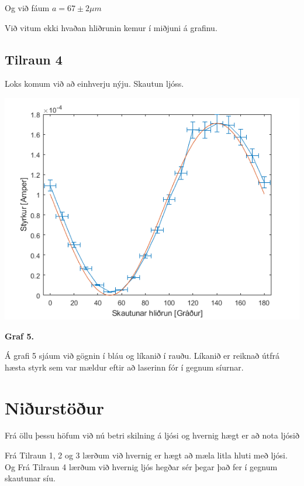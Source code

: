 \documentclass[12pt]{article}
\begin{document}
Og við fáum $a=67\pm 2 \mu m$

Við vitum ekki hvaðan hliðrunin kemur í miðjuni á grafinu.

\subsection{Tilraun 4}

Loks komum við að einhverju nýju. Skautun ljóss.

\begin{center}
    \includegraphics[scale=0.5]{html/data_05.png}
    
    \bf Graf 5.
\end{center}

Á grafi 5 sjáum við gögnin í bláu og líkanið í rauðu. Líkanið er reiknað útfrá hæsta styrk sem var mældur eftir að laserinn fór í gegnum síurnar.

\section{Niðurstöður}

Frá öllu þessu höfum við nú betri skilning á ljósi og hvernig hægt er að nota ljósið

Frá Tilraun 1, 2 og 3 lærðum við hvernig er hægt að mæla litla hluti með ljósi. Og Frá Tilraun 4 lærðum við hvernig ljós hegðar sér þegar það fer í gegnum skautunar síu.
\end{document}
